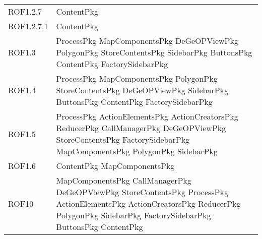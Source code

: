 \begin{longtable}{p{2.5cm}!{\VRule[1pt]}p{5cm}}
		ROF1.2.7 & ContentPkg\\
		ROF1.2.7.1 & ContentPkg\\
		ROF1.3 & ProcessPkg \newline MapComponentsPkg \newline DeGeOPViewPkg \newline PolygonPkg \newline StoreContentsPkg \newline SidebarPkg \newline ButtonsPkg \newline ContentPkg \newline FactorySidebarPkg\\
		ROF1.4 & ProcessPkg \newline MapComponentsPkg \newline PolygonPkg \newline StoreContentsPkg \newline DeGeOPViewPkg \newline SidebarPkg \newline ButtonsPkg \newline ContentPkg \newline FactorySidebarPkg\\
		ROF1.5 & ProcessPkg \newline ActionElementsPkg \newline ActionCreatorsPkg \newline ReducerPkg \newline CallManagerPkg \newline DeGeOPViewPkg \newline StoreContentsPkg \newline FactorySidebarPkg \newline MapComponentsPkg \newline PolygonPkg \newline SidebarPkg\\
		ROF1.6 & ContentPkg \newline MapComponentsPkg\\
		ROF10 & MapComponentsPkg \newline CallManagerPkg \newline DeGeOPViewPkg \newline StoreContentsPkg \newline ProcessPkg \newline ActionElementsPkg \newline ActionCreatorsPkg \newline ReducerPkg \newline PolygonPkg \newline SidebarPkg \newline FactorySidebarPkg \newline ButtonsPkg \newline ContentPkg\\

\end{longtable}
